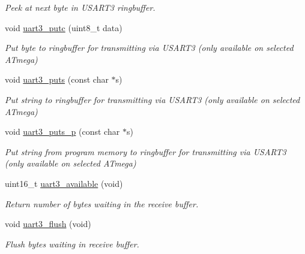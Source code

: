 \begin{DoxyCompactItemize}
\begin{DoxyCompactList}\small\item\em Peek at next byte in U\+S\+A\+R\+T3 ringbuffer. \end{DoxyCompactList}\item 
void \hyperlink{group__avr-uart_gaedb6deebd5dc189b7ab7a49b655eedd7}{uart3\+\_\+putc} (uint8\+\_\+t data)
\begin{DoxyCompactList}\small\item\em Put byte to ringbuffer for transmitting via U\+S\+A\+R\+T3 (only available on selected A\+Tmega) \end{DoxyCompactList}\item 
void \hyperlink{group__avr-uart_gaa7ea14ab43946a921d0da142d005ed56}{uart3\+\_\+puts} (const char $\ast$s)
\begin{DoxyCompactList}\small\item\em Put string to ringbuffer for transmitting via U\+S\+A\+R\+T3 (only available on selected A\+Tmega) \end{DoxyCompactList}\item 
void \hyperlink{group__avr-uart_gad7d9650ed5fa2929e840aace337a3476}{uart3\+\_\+puts\+\_\+p} (const char $\ast$s)
\begin{DoxyCompactList}\small\item\em Put string from program memory to ringbuffer for transmitting via U\+S\+A\+R\+T3 (only available on selected A\+Tmega) \end{DoxyCompactList}\item 
\hypertarget{group__avr-uart_ga66823fdca13c3b045bbfc4d61aa1225c}{}uint16\+\_\+t \hyperlink{group__avr-uart_ga66823fdca13c3b045bbfc4d61aa1225c}{uart3\+\_\+available} (void)\label{group__avr-uart_ga66823fdca13c3b045bbfc4d61aa1225c}

\begin{DoxyCompactList}\small\item\em Return number of bytes waiting in the receive buffer. \end{DoxyCompactList}\item 
\hypertarget{group__avr-uart_gab0acffb07262f22021d7067471df5040}{}void \hyperlink{group__avr-uart_gab0acffb07262f22021d7067471df5040}{uart3\+\_\+flush} (void)\label{group__avr-uart_gab0acffb07262f22021d7067471df5040}

\begin{DoxyCompactList}\small\item\em Flush bytes waiting in receive buffer. \end{DoxyCompactList}\end{DoxyCompactItemize}


